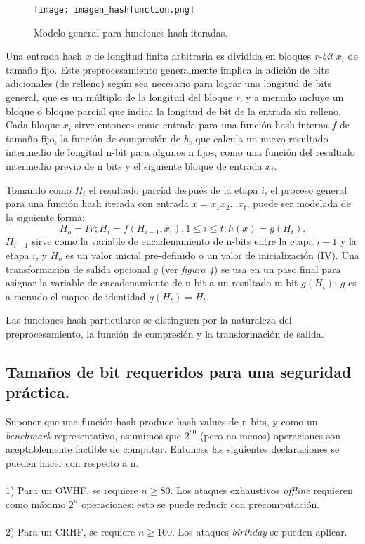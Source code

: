 \documentclass[a4paper, 12pt]{article} %
\begin{document}
\begin{figure}[h!]
	\centering
	\texttt{[image: imagen\_hashfunction.png]}
	\caption{Modelo general para funciones hash iteradas.}
	\label{fig:Modelo_iteradas}
\end{figure}

Una entrada hash $x$ de longitud finita arbitraria es dividida en bloques \textit{r-bit} $x_i$ de tamaño fijo.
Este preprocesamiento generalmente implica la adición de bits adicionales (de relleno) según sea
necesario para lograr una longitud de bits general, que es un múltiplo de la longitud del bloque \textit{r}, y
a menudo incluye un bloque o bloque parcial que indica la longitud de bit de la entrada sin relleno.
Cada bloque $x_i$ sirve entonces como entrada para una función hash interna $f$ de tamaño fijo, la función
de compresión de $h$, que calcula un nuevo resultado intermedio de longitud n-bit para algunos n fijos,
como una función del resultado intermedio previo de n bits y el siguiente bloque de entrada $x_i$.

Tomando como $H_i$ el resultado parcial después de la etapa $i$, el proceso general para una función
hash iterada con entrada $x = x_1 x_2 ... x_t$, puede ser modelada de la siguiente forma:
\begin{equation*}
	H_o = IV;  H_i = f(H_{i-1}, x_i),  1 \leq i \leq t;  h(x) = g(H_t).
\end{equation*}
$H_{i-1}$ sirve como la variable de encadenamiento de n-bits entre la etapa $i-1$ y la etapa $i$, y
$H_o$ es un valor inicial pre-definido o un valor de inicialización (IV). Una transformación de salida opcional
$g$ (ver \textit{figura 4}) se usa en un paso final para asignar la variable de encadenamiento de n-bit a
un resultado m-bit $g(H_t)$; $g$ es a menudo el mapeo de identidad $g(H_t) = H_t$.

Las funciones hash particulares se distinguen por la naturaleza del preprocesamiento, la función de compresión y
la transformación de salida.

\subsection{Tamaños de bit requeridos para una seguridad práctica.}
Suponer que una función hash produce hash-values de n-bits, y como un \textit{benchmark} representativo, asumimos
que $2^{80}$ (pero no menos) operaciones son aceptablemente factible de computar. Entonces las siguientes
declaraciones se pueden hacer con respecto a n.\\ \\
1) Para un OWHF, se requiere $n \geq 80$. Los ataques exhaustivos \textit{offline} requieren como máximo $2^n$
operaciones; esto se puede reducir con precomputación.\\ \\
2) Para un CRHF, se requiere $n \geq 160$. Los ataques \textit{birthday} se pueden aplicar.
\end{document}
